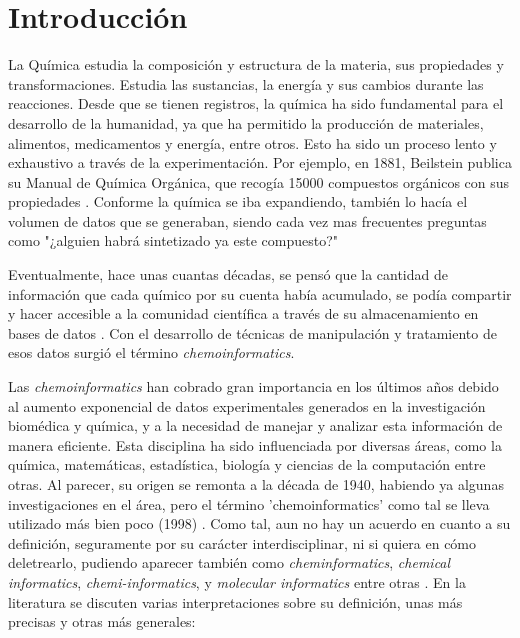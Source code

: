 \chapter{Introducción}





La Química estudia la composición y estructura de la materia, sus propiedades y transformaciones. Estudia las sustancias, la energía y sus cambios durante las reacciones. Desde que se tienen registros, la química ha sido fundamental para el desarrollo de la humanidad, ya que ha permitido la producción de materiales, alimentos, medicamentos y energía, entre otros. Esto ha sido un proceso lento y exhaustivo a través de la experimentación. Por ejemplo, en 1881, Beilstein publica su Manual de Química Orgánica, que recogía 15000 compuestos orgánicos con sus propiedades \cite{handbook_1881}. Conforme la química se iba expandiendo, también lo hacía el volumen de datos que se generaban, siendo cada vez mas frecuentes preguntas como "¿alguien habrá sintetizado ya este compuesto?" \cite{applied_chemo_intro}

Eventualmente, hace unas cuantas décadas, se pensó que la cantidad de información que cada químico por su cuenta había acumulado, se podía compartir y hacer accesible a la comunidad científica a través de su almacenamiento en bases de datos \cite{chemo_a_textbook}. Con el desarrollo de técnicas de manipulación y tratamiento de esos datos surgió el término \emph{chemoinformatics}.

Las \emph{chemoinformatics} han cobrado gran importancia en los últimos años debido al aumento exponencial de datos experimentales generados en la investigación biomédica y química, y a la necesidad de manejar y analizar esta información de manera eficiente.
Esta disciplina ha sido influenciada por diversas áreas, como la química, matemáticas, estadística, biología y ciencias de la computación entre otras. Al parecer, su origen se remonta a la década de 1940, habiendo ya algunas investigaciones en el área, pero el término 'chemoinformatics' como tal se lleva utilizado más bien poco (1998) \cite{leach_introduction_2007}. Como tal, aun no hay un acuerdo en cuanto a su definición, seguramente por su carácter interdisciplinar, ni si quiera en cómo deletrearlo, pudiendo aparecer también como \emph{cheminformatics}, \emph{chemical informatics}, \emph{chemi-informatics}, y \emph{molecular informatics} entre otras \cite{leach_introduction_2007, brown_chemoinformaticsintroduction_2009}. En la literatura se discuten varias interpretaciones sobre su definición, unas más precisas y otras más generales: \cite{leach_introduction_2007, basic_overview_chemo, brown_chemoinformaticsintroduction_2009, chemo_a_textbook}


